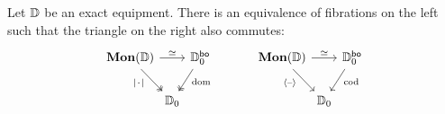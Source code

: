 \documentclass[11pt,oneside,article]{memoir}
\begin{document}
\begin{proposition}
    \label{prop:Mon_vs_bo}
  Let $\mathbb{D}$ be an exact equipment. There is an equivalence of fibrations on the left such
  that the triangle on the right also commutes:
  \begin{equation*}
    \begin{tikzcd}[column sep=0em]
      \Mon(\dcat{D}) \ar[rr,"\equiv"] \ar[dr,two heads,"\MOb"' pos=.3]
        && \dcat{D}_0^{\bo} \ar[dl,two heads,"\dom" pos=.3] \\
      & \dcat{D}_0 &
    \end{tikzcd}
    \qquad\quad
    \begin{tikzcd}[column sep=0em]
      \Mon(\dcat{D}) \ar[rr,"\equiv"] \ar[dr,"\ColDash"' pos=.3]
        && \dcat{D}_0^{\bo} \ar[dl,"\cod" pos=.3] \\
      & \dcat{D}_0 &
    \end{tikzcd}
  \end{equation*}
\end{proposition}
\end{document}
